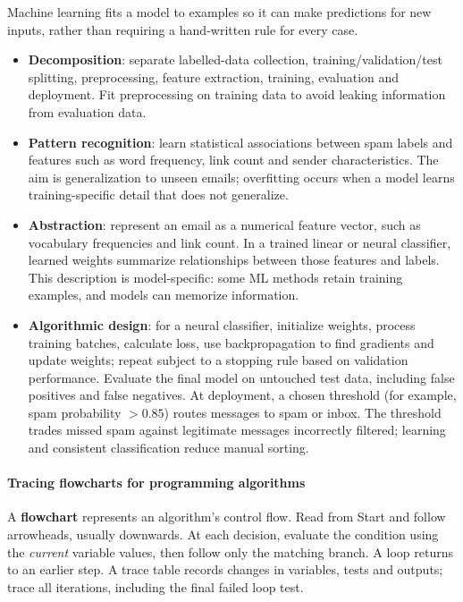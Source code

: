 \documentclass[a4paper,12pt]{article}
\begin{document}
Machine learning fits a model to examples so it can make predictions for new inputs, rather than requiring a hand-written rule for every case.
\begin{itemize}
    \item \textbf{Decomposition}: separate labelled-data collection, training/validation/test splitting, preprocessing, feature extraction, training, evaluation and deployment. Fit preprocessing on training data to avoid leaking information from evaluation data.
    \item \textbf{Pattern recognition}: learn statistical associations between spam labels and features such as word frequency, link count and sender characteristics. The aim is generalization to unseen emails; overfitting occurs when a model learns training-specific detail that does not generalize.
    \item \textbf{Abstraction}: represent an email as a numerical feature vector, such as vocabulary frequencies and link count. In a trained linear or neural classifier, learned weights summarize relationships between those features and labels. This description is model-specific: some ML methods retain training examples, and models can memorize information.
    \item \textbf{Algorithmic design}: for a neural classifier, initialize weights, process training batches, calculate loss, use backpropagation to find gradients and update weights; repeat subject to a stopping rule based on validation performance. Evaluate the final model on untouched test data, including false positives and false negatives. At deployment, a chosen threshold (for example, spam probability $>0.85$) routes messages to spam or inbox. The threshold trades missed spam against legitimate messages incorrectly filtered; learning and consistent classification reduce manual sorting.
\end{itemize}

\paragraph{Tracing flowcharts for programming algorithms}
A \textbf{flowchart} represents an algorithm's control flow. Read from Start and follow arrowheads, usually downwards. At each decision, evaluate the condition using the \emph{current} variable values, then follow only the matching branch. A loop returns to an earlier step. A trace table records changes in variables, tests and outputs; trace all iterations, including the final failed loop test.
\end{document}
